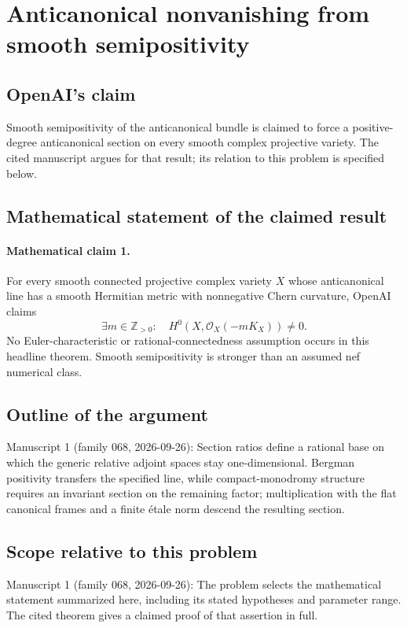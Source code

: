 \documentclass[11pt]{article}
\begin{document}
\section*{Anticanonical nonvanishing from smooth semipositivity}

\subsection{OpenAI's claim}
Smooth semipositivity of the anticanonical bundle is claimed to force a positive-degree anticanonical section on every smooth complex projective variety. The cited manuscript argues for that result; its relation to this problem is specified below.

\subsection{Mathematical statement of the claimed result}
\paragraph{Mathematical claim 1.} For every smooth connected projective complex variety $X$ whose anticanonical line has a smooth Hermitian metric with nonnegative Chern curvature, OpenAI claims
\[
\exists m\in\mathbb Z_{>0}:\quad H^0(X,\mathcal O_X(-mK_X))\ne0.
\]
No Euler-characteristic or rational-connectedness assumption occurs in this headline theorem. Smooth semipositivity is stronger than an assumed nef numerical class.

\subsection{Outline of the argument}
Manuscript 1 (family 068, 2026-09-26): Section ratios define a rational base on which the generic relative adjoint spaces stay one-dimensional. Bergman positivity transfers the specified line, while compact-monodromy structure requires an invariant section on the remaining factor; multiplication with the flat canonical frames and a finite étale norm descend the resulting section.

\subsection{Scope relative to this problem}
Manuscript 1 (family 068, 2026-09-26): The problem selects the mathematical statement summarized here, including its stated hypotheses and parameter range. The cited theorem gives a claimed proof of that assertion in full.
\end{document}
